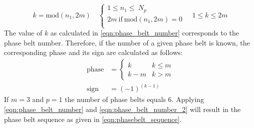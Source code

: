 \begin{equation}
  \label{eqn:phase_belt_number}
  k = \mbox{mod}(n_1,2m)
  \quad
  \begin{cases}
    1 \leq n_1 \leq \ N_p \\
    2m \ \mbox{if} \ \mbox{mod}(n_1,2m)=0 \\
  \end{cases}
  \quad
  1\leq k \leq 2m
\end{equation}  
The value of $k$ as calculated in \eqref{eqn:phase_belt_number} corresponds to the phase belt number. Therefore, if the number of a given phase belt is known, the corresponding phase and its sign are calculated as follows:
\begin{equation}
  \label{eqn:phase_belt_number_2}
  \begin{aligned}
  \mbox{phase}&= 
    \left\{
    \begin{array}{ll}
	    k   & k \leq m\\
	    k-m & k > m
	  \end{array}
	  \right.
	  \\
	\mbox{sign}&=(-1)^{(k-1)} 
  \end{aligned}
\end{equation}	
If $m=3$ and $p=1$ the number of phase belts equals 6. Applying \eqref{eqn:phase_belt_number} and \eqref{eqn:phase_belt_number_2} will result in the phase belt sequence as given in \eqref{eqn:phasebelt_sequence}. 

